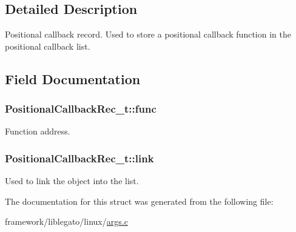 \subsection{Detailed Description}
Positional callback record. Used to store a positional callback function in the positional callback list. 

\subsection{Field Documentation}
\subsubsection[{\texorpdfstring{func}{func}}]{ Positional\+Callback\+Rec\+\_\+t\+::func}\hypertarget{struct_positional_callback_rec__t_a7a639dc0f2caa7dcb03664e3d96b2471}{}\label{struct_positional_callback_rec__t_a7a639dc0f2caa7dcb03664e3d96b2471}


Function address. 

\subsubsection[{\texorpdfstring{link}{link}}]{ Positional\+Callback\+Rec\+\_\+t\+::link}\hypertarget{struct_positional_callback_rec__t_a4b97acd846773b5aecd04700421e01ab}{}\label{struct_positional_callback_rec__t_a4b97acd846773b5aecd04700421e01ab}


Used to link the object into the list. 



The documentation for this struct was generated from the following file\+:\begin{DoxyCompactItemize}
\item 
framework/liblegato/linux/\hyperlink{args_8c}{args.\+c}\end{DoxyCompactItemize}

